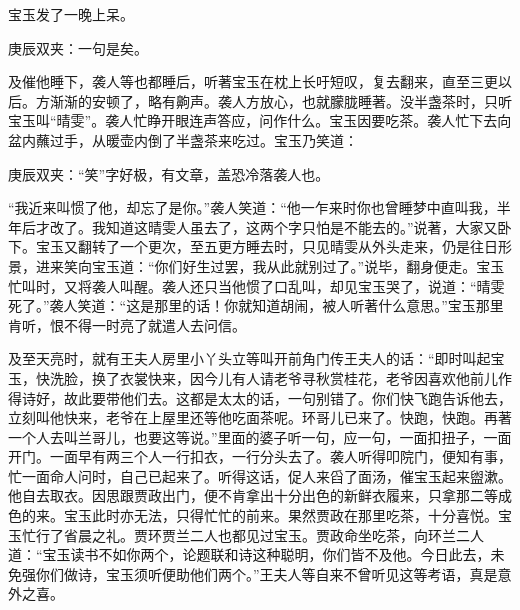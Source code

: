 \begin{parag}
    宝玉发了一晚上呆。\begin{note}庚辰双夹：一句是矣。\end{note}及催他睡下，袭人等也都睡后，听著宝玉在枕上长吁短叹，复去翻来，直至三更以后。方渐渐的安顿了，略有齁声。袭人方放心，也就朦胧睡著。没半盏茶时，只听宝玉叫“晴雯”。袭人忙睁开眼连声答应，问作什么。宝玉因要吃茶。袭人忙下去向盆内蘸过手，从暖壶内倒了半盏茶来吃过。宝玉乃笑道：\begin{note}庚辰双夹：“笑”字好极，有文章，盖恐冷落袭人也。\end{note}“我近来叫惯了他，却忘了是你。”袭人笑道：“他一乍来时你也曾睡梦中直叫我，半年后才改了。我知道这晴雯人虽去了，这两个字只怕是不能去的。”说著，大家又卧下。宝玉又翻转了一个更次，至五更方睡去时，只见晴雯从外头走来，仍是往日形景，进来笑向宝玉道：“你们好生过罢，我从此就别过了。”说毕，翻身便走。宝玉忙叫时，又将袭人叫醒。袭人还只当他惯了口乱叫，却见宝玉哭了，说道：“晴雯死了。”袭人笑道：“这是那里的话！你就知道胡闹，被人听著什么意思。”宝玉那里肯听，恨不得一时亮了就遣人去问信。
\end{parag}


\begin{parag}
    及至天亮时，就有王夫人房里小丫头立等叫开前角门传王夫人的话：“即时叫起宝玉，快洗脸，换了衣裳快来，因今儿有人请老爷寻秋赏桂花，老爷因喜欢他前儿作得诗好，故此要带他们去。这都是太太的话，一句别错了。你们快飞跑告诉他去，立刻叫他快来，老爷在上屋里还等他吃面茶呢。环哥儿已来了。快跑，快跑。再著一个人去叫兰哥儿，也要这等说。”里面的婆子听一句，应一句，一面扣扭子，一面开门。一面早有两三个人一行扣衣，一行分头去了。袭人听得叩院门，便知有事，忙一面命人问时，自己已起来了。听得这话，促人来舀了面汤，催宝玉起来盥漱。他自去取衣。因思跟贾政出门，便不肯拿出十分出色的新鲜衣履来，只拿那二等成色的来。宝玉此时亦无法，只得忙忙的前来。果然贾政在那里吃茶，十分喜悦。宝玉忙行了省晨之礼。贾环贾兰二人也都见过宝玉。贾政命坐吃茶，向环兰二人道：“宝玉读书不如你两个，论题联和诗这种聪明，你们皆不及他。今日此去，未免强你们做诗，宝玉须听便助他们两个。”王夫人等自来不曾听见这等考语，真是意外之喜。
\end{parag}


